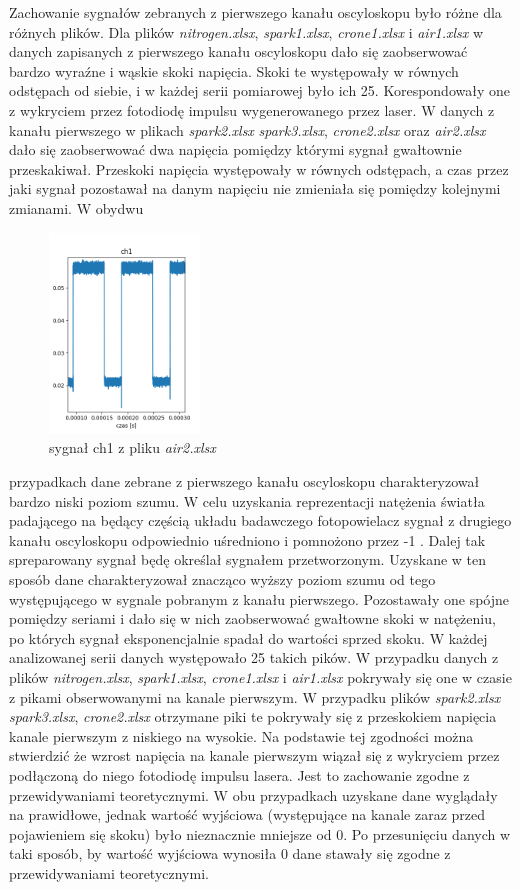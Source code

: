 \documentclass[10pt,a4paper]{article}
\begin{document}
Zachowanie sygnałów zebranych z pierwszego kanału oscyloskopu było różne dla różnych plików. Dla plików \textit{nitrogen.xlsx}, \textit{spark1.xlsx}, \textit{crone1.xlsx} i \textit{air1.xlsx} w danych zapisanych z pierwszego kanału oscyloskopu dało się zaobserwować bardzo wyraźne i wąskie skoki napięcia. Skoki te występowały w równych odstępach od siebie, i w każdej serii pomiarowej było ich 25. Korespondowały one z wykryciem przez fotodiodę impulsu wygenerowanego przez laser.
W danych z kanału pierwszego w plikach \textit{spark2.xlsx} \textit{spark3.xlsx}, \textit{crone2.xlsx} oraz \textit{air2.xlsx} dało się zaobserwować dwa napięcia pomiędzy którymi sygnał gwałtownie przeskakiwał. Przeskoki napięcia występowały w równych odstępach, a czas przez jaki sygnał pozostawał na danym napięciu nie zmieniała się pomiędzy kolejnymi zmianami. W obydwu
\newpage 
\begin{figure}
    \centering
    \includegraphics[width=4cm]{pictures/ch1_2.png}
    \caption{sygnał ch1 z pliku  \textit{air2.xlsx}}
    \label{ch1_2}
\end{figure}
przypadkach dane zebrane z pierwszego kanału oscyloskopu charakteryzował bardzo niski poziom szumu. 
W celu uzyskania reprezentacji natężenia światła padającego na będący częścią układu badawczego fotopowielacz sygnał z drugiego kanału oscyloskopu odpowiednio uśredniono i pomnożono przez -1 \cite{strona}. Dalej tak spreparowany sygnał będę określał sygnałem przetworzonym. Uzyskane w ten sposób dane charakteryzował znacząco wyższy poziom szumu od tego występującego w sygnale pobranym z kanału pierwszego. Pozostawały one spójne pomiędzy seriami i dało się w nich zaobserwować gwałtowne skoki w natężeniu, po których sygnał eksponencjalnie spadał do wartości sprzed skoku. W  każdej analizowanej serii danych występowało 25 takich pików. W przypadku danych z plików \textit{nitrogen.xlsx}, \textit{spark1.xlsx}, \textit{crone1.xlsx} i \textit{air1.xlsx} pokrywały się one w czasie z pikami obserwowanymi na kanale pierwszym. W przypadku plików \textit{spark2.xlsx} \textit{spark3.xlsx}, \textit{crone2.xlsx} otrzymane piki te pokrywały się z przeskokiem napięcia kanale pierwszym z niskiego na wysokie. Na podstawie tej zgodności można stwierdzić że wzrost napięcia na kanale pierwszym wiązał się z wykryciem przez podłączoną do niego fotodiodę impulsu lasera. Jest to zachowanie zgodne z przewidywaniami teoretycznymi. W obu przypadkach uzyskane dane wyglądały na prawidłowe, jednak wartość wyjściowa (występujące na kanale zaraz przed pojawieniem się skoku) było nieznacznie mniejsze od 0. Po przesunięciu danych w taki sposób, by wartość wyjściowa wynosiła  0 dane stawały się zgodne z przewidywaniami teoretycznymi.
\end{document}

